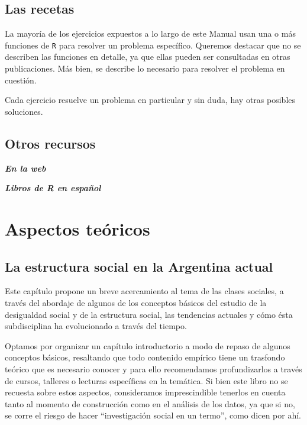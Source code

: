 \documentclass[
]{book}
\begin{document}
\hypertarget{las-recetas}{%
\chapter{Las recetas}\label{las-recetas}}

La mayoría de los ejercicios expuestos a lo largo de este Manual usan una o más funciones de \texttt{R} para resolver un problema específico. Queremos destacar que no se describen las funciones en detalle, ya que ellas pueden ser consultadas en otras publicaciones. Más bien, se describe lo necesario para resolver el problema en cuestión.

Cada ejercicio resuelve un problema en particular y sin duda, hay otras posibles soluciones.

\hypertarget{otros-recursos}{%
\chapter{Otros recursos}\label{otros-recursos}}

\textbf{\emph{En la web}}

\textbf{\emph{Libros de R en español}}

\hypertarget{part-aspectos-teuxf3ricos}{%
\part{Aspectos teóricos}\label{part-aspectos-teuxf3ricos}}

\hypertarget{estructura1}{%
\chapter{La estructura social en la Argentina actual}\label{estructura1}}

Este capítulo propone un breve acercamiento al tema de las clases sociales, a través del abordaje de algunos de los conceptos básicos del estudio de la desigualdad social y de la estructura social, las tendencias actuales y cómo ésta subdisciplina ha evolucionado a través del tiempo.

Optamos por organizar un capítulo introductorio a modo de repaso de algunos conceptos básicos, resaltando que todo contenido empírico tiene un trasfondo teórico que es necesario conocer y para ello recomendamos profundizarlos a través de cursos, talleres o lecturas específicas en la temática. Si bien este libro no se recuesta sobre estos aspectos, consideramos imprescindible tenerlos en cuenta tanto al momento de construcción como en el análisis de los datos, ya que si no, se corre el riesgo de hacer ``investigación social en un termo'', como dicen por ahí.
\end{document}
